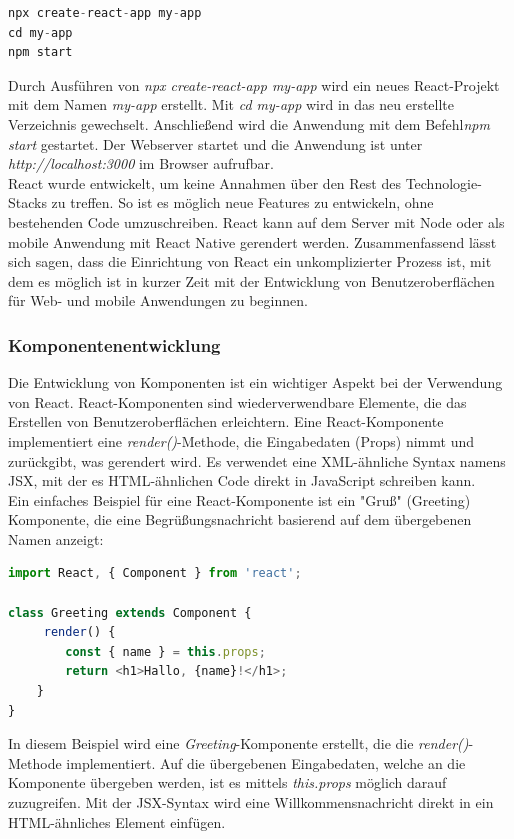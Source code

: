\begin{lstlisting}[language=JavaScript,
	frame=single,           % Ein Rahmen um den Code
	framexleftmargin=15pt,  % Rahmen link von den Zahlen
	style=algoBericht,
	label={App-Erstellung},
	captionpos=b ,          % Caption unter den Code setzen
	caption={Beispiel Anwendungserstellung}]
npx create-react-app my-app
cd my-app
npm start
\end{lstlisting}
Durch  Ausführen von \emph{npx create-react-app my-app} wird ein neues React-Projekt mit dem Namen \emph{my-app} erstellt. Mit \emph{cd my-app} wird in das neu erstellte Verzeichnis gewechselt. Anschließend wird die Anwendung mit dem Befehl\emph{npm start} gestartet.
Der Webserver startet und die Anwendung ist unter \emph{http://localhost:3000} im Browser aufrufbar.\\ 
React wurde entwickelt, um keine Annahmen über den Rest des Technologie-Stacks zu treffen. So ist es möglich neue Features zu entwickeln, ohne bestehenden Code umzuschreiben\cite{deLegacyReactjsDocs}. React kann  auf dem Server mit Node oder als mobile Anwendung mit React Native gerendert werden. 
Zusammenfassend lässt sich sagen, dass die Einrichtung von React ein unkomplizierter Prozess ist, mit dem es möglich ist in kurzer Zeit mit der Entwicklung von Benutzeroberflächen für Web- und mobile Anwendungen zu beginnen.

\subsubsection{Komponentenentwicklung}
Die Entwicklung von Komponenten ist ein wichtiger Aspekt bei der Verwendung von React. React-Komponenten sind wiederverwendbare Elemente, die das Erstellen von Benutzeroberflächen erleichtern. Eine React-Komponente implementiert eine \emph{render()}-Methode, die Eingabedaten (Props) nimmt und zurückgibt, was gerendert wird. Es verwendet eine XML-ähnliche Syntax namens JSX, mit der es HTML-ähnlichen Code direkt in JavaScript schreiben kann.\cite{deLegacyReactjs}\\
Ein einfaches Beispiel für eine React-Komponente ist ein "Gruß" (Greeting) Komponente, die eine Begrüßungsnachricht basierend auf dem übergebenen Namen anzeigt:
\begin{lstlisting}[language=JavaScript,
	frame=single,           % Ein Rahmen um den Code
	framexleftmargin=15pt,  % Rahmen link von den Zahlen
	style=algoBericht,
	label={Greeting-Komponente},
	captionpos=b ,          % Caption unter den Code setzen
	caption={Beispiel Komponentenentwicklung }]
import React, { Component } from 'react';

class Greeting extends Component {
     render() {
        const { name } = this.props;
        return <h1>Hallo, {name}!</h1>;
    }
}
\end{lstlisting}
In diesem Beispiel wird eine \emph{Greeting}-Komponente erstellt, die die \emph{render()}-Methode implementiert. Auf die übergebenen Eingabedaten, welche an die Komponente übergeben werden, ist es mittels \emph{this.props} möglich darauf zuzugreifen\cite{deLegacyReactjs}. Mit der JSX-Syntax wird eine Willkommensnachricht direkt in ein HTML-ähnliches Element einfügen. \\

